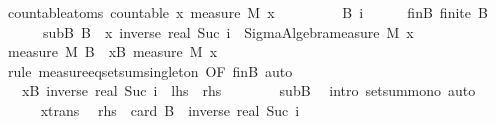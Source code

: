 \documentclass[leqno]{article}
\theoremstyle{definition}
\begin{document}
\begin{isabellebody}
\isamarkupfalse%
\ countable{\isacharunderscore}atoms{\isacharcolon}\ {\isachardoublequoteopen}countable\ {\isacharbraceleft}x{\isachardot}\ measure\ M\ {\isacharbraceleft}x{\isacharbraceright}\ {\isachargreater}\ {}{\isacharbraceright}{\isachardoublequoteclose}\isanewline
{}\isamarkupfalse%
\ {\isacharminus}\isanewline
\ \ \isacommand{{\isacharbraceleft}}\isamarkupfalse%
\ \isamarkupfalse%
\ B\ i\isanewline
\ \ \ \ \isamarkupfalse%
\ finB{\isacharcolon}\ {\isachardoublequoteopen}finite\ B{\isachardoublequoteclose}\ \ \isanewline
\ \ \ \ \ \ subB{\isacharcolon}\ {\isachardoublequoteopen}B\ {\isasymsubseteq}\ {\isacharbraceleft}x{\isachardot}\ inverse\ {\isacharparenleft}real\ {\isacharparenleft}Suc\ i{\isacharparenright}{\isacharparenright}\ {\isacharless}\ Sigma{\isacharunderscore}Algebra{\isachardot}measure\ M\ {\isacharbraceleft}x{\isacharbraceright}{\isacharbraceright}{\isachardoublequoteclose}\isanewline
\ \ \ \ \isamarkupfalse%
\ {\isachardoublequoteopen}measure\ M\ B\ {\isacharequal}\ {\isacharparenleft}{\isasymSum}x{\isasymin}B{\isachardot}\ measure\ M\ {\isacharbraceleft}x{\isacharbraceright}{\isacharparenright}{\isachardoublequoteclose}\isanewline
\ \ \ \ \ \ \isamarkupfalse%
\ {\isacharparenleft}rule\ measure{\isacharunderscore}eq{\isacharunderscore}setsum{\isacharunderscore}singleton\ {\isacharbrackleft}OF\ finB{\isacharbrackright}{\isacharcomma}\ auto{\isacharparenright}\isanewline
\ \ \ \ \isamarkupfalse%
\ \isamarkupfalse%
\ {\isachardoublequoteopen}{\isasymdots}\ {\isasymge}\ {\isacharparenleft}{\isasymSum}x{\isasymin}B{\isachardot}\ inverse\ {\isacharparenleft}real\ {\isacharparenleft}Suc\ i{\isacharparenright}{\isacharparenright}{\isacharparenright}{\isachardoublequoteclose}\ {\isacharparenleft}\ {\isachardoublequoteopen}{\isacharquery}lhs\ {\isasymge}\ {\isacharquery}rhs{\isachardoublequoteclose}{\isacharparenright}\isanewline
\ \ \ \ \ \ \isamarkupfalse%
\ subB\ \isamarkupfalse%
\ {\isacharparenleft}intro\ setsum{\isacharunderscore}mono{\isacharcomma}\ auto{\isacharparenright}\isanewline
\ \ \ \ \isamarkupfalse%
\ {\isacharparenleft}xtrans{\isacharparenright}\ \isamarkupfalse%
\ {\isachardoublequoteopen}{\isacharquery}rhs\ {\isacharequal}\ card\ B\ {\isacharasterisk}\ inverse\ {\isacharparenleft}real\ {\isacharparenleft}Suc\ i{\isacharparenright}{\isacharparenright}{\isachardoublequoteclose}\isanewline

\end{isabellebody}
\end{document}
